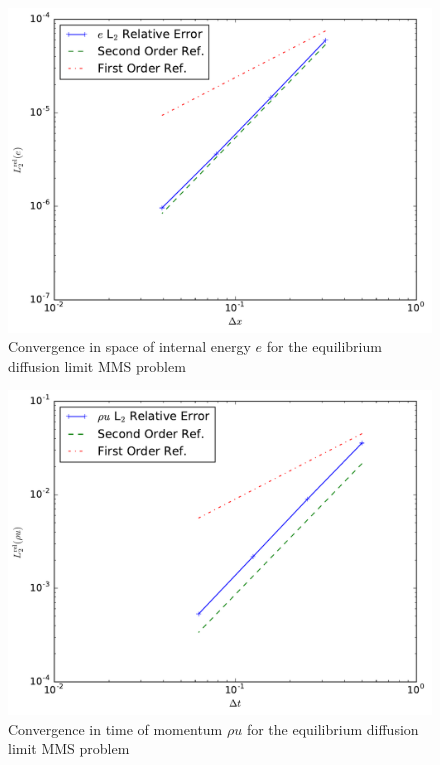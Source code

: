 \documentclass[preprint,12pt]{elsarticle}
\begin{document}
\begin{figure}[ht]
   \centering
   \includegraphics[width=\textwidth]{figures/MMS_diffusion_limit_e_convergence.pdf}
   \caption{Convergence in space of internal energy $e$ for the equilibrium diffusion limit MMS problem}
   \label{fig:diff_limit_e}
\end{figure}
\begin{figure}[ht]
   \centering
   \includegraphics[width=\textwidth]{figures/MMS_diffusion_limit_rhou_convergence.pdf}
   \caption{Convergence in time of momentum $\rho u$ for the equilibrium diffusion limit MMS problem}
   \label{fig:diff_limit_mom}
\end{figure}
\end{document}
